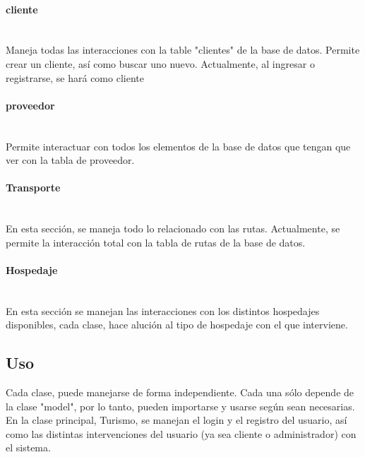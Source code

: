 \documentclass{article}
\begin{document}
        \paragraph{cliente}\mbox{}\\
        Maneja todas las interacciones con la table "clientes" de la base de datos. Permite crear un cliente, así como buscar uno nuevo. Actualmente, al ingresar o registrarse, se hará como cliente
        \paragraph{proveedor}\mbox{}\\
        Permite interactuar con todos los elementos de la base de datos que tengan que ver con la tabla de proveedor. 
        \paragraph{Transporte}\mbox{}\\
        En esta sección, se maneja todo lo relacionado con las rutas. Actualmente, se permite la interacción total con la tabla de rutas de la base de datos.
        \paragraph{Hospedaje}\mbox{}\\
        En esta sección se manejan las interacciones con los distintos hospedajes disponibles, cada clase, hace alución al tipo de hospedaje con el que interviene.
        
        
\subsection{Uso}
Cada clase, puede manejarse de forma independiente. Cada una sólo depende de la clase "model", por lo tanto, pueden importarse y usarse según sean necesarias.
En la clase principal, Turismo, se manejan el login y el registro del usuario, así como las distintas intervenciones del usuario (ya sea cliente o administrador) con el sistema. 
\end{document}
